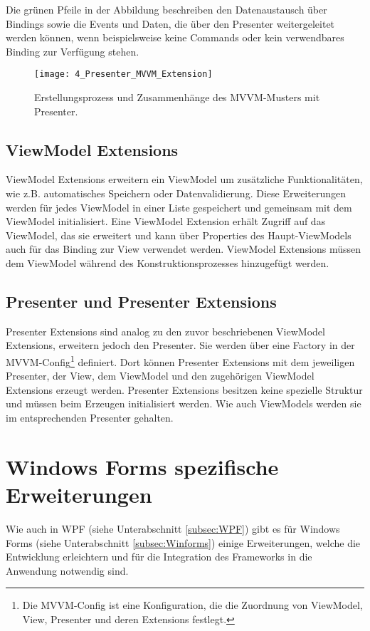 Die grünen Pfeile in der Abbildung beschreiben den Datenaustausch über Bindings sowie die Events und Daten, die über den Presenter weitergeleitet werden können, wenn beispielsweise keine Commands oder kein verwendbares Binding zur Verfügung stehen.

\begin{figure}[H]
    \centering
    \texttt{[image: 4\_Presenter\_MVVM\_Extension]}
    \caption{Erstellungsprozess und Zusammenhänge des MVVM-Musters mit Presenter.}
    \label{fig:mvvm_with_presenter}
\end{figure}

\subsection{ViewModel Extensions}
\label{subsec:viewmodel_extensions}
ViewModel Extensions erweitern ein ViewModel um zusätzliche Funktionalitäten, wie z.B. automatisches Speichern oder Datenvalidierung. Diese Erweiterungen werden für jedes ViewModel in einer Liste gespeichert und gemeinsam mit dem ViewModel initialisiert. Eine ViewModel Extension erhält Zugriff auf das ViewModel, das sie erweitert und kann über Properties des Haupt-ViewModels auch für das Binding zur View verwendet werden. ViewModel Extensions müssen dem ViewModel während des Konstruktionsprozesses hinzugefügt werden.

\subsection{Presenter und Presenter Extensions}
\label{subsec:presenter_extensions}
Presenter Extensions sind analog zu den zuvor beschriebenen ViewModel Extensions, erweitern jedoch den Presenter. Sie werden über eine Factory in der MVVM-Config\footnote{Die MVVM-Config ist eine Konfiguration, die die Zuordnung von ViewModel, View, Presenter und deren Extensions festlegt.} definiert. Dort können Presenter Extensions mit dem jeweiligen Presenter, der View, dem ViewModel und den zugehörigen ViewModel Extensions erzeugt werden. Presenter Extensions besitzen keine spezielle Struktur und müssen beim Erzeugen initialisiert werden. Wie auch ViewModels werden sie im entsprechenden Presenter gehalten.

\section{Windows Forms spezifische Erweiterungen}
\label{sec:mvp_extensions}
Wie auch in WPF (siehe Unterabschnitt \ref{subsec:WPF}) gibt es für Windows Forms (siehe Unterabschnitt \ref{subsec:Winforms}) einige Erweiterungen, welche die Entwicklung erleichtern und für die Integration des Frameworks in die Anwendung notwendig sind.

